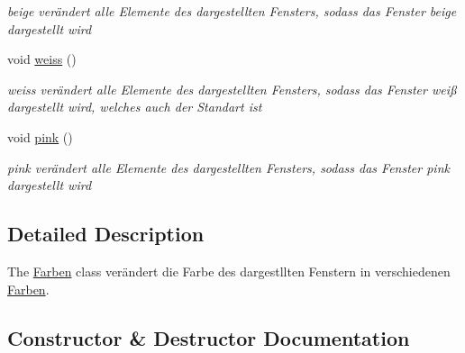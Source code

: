 \begin{DoxyCompactItemize}
\begin{DoxyCompactList}\small\item\em beige verändert alle Elemente des dargestellten Fensters, sodass das Fenster beige dargestellt wird \end{DoxyCompactList}\item 
void \hyperlink{class_farben_aea092a6a334b11f456975325f41c69b4}{weiss} ()\hypertarget{class_farben_aea092a6a334b11f456975325f41c69b4}{}\label{class_farben_aea092a6a334b11f456975325f41c69b4}

\begin{DoxyCompactList}\small\item\em weiss verändert alle Elemente des dargestellten Fensters, sodass das Fenster weiß dargestellt wird, welches auch der Standart ist \end{DoxyCompactList}\item 
void \hyperlink{class_farben_a420c471b006d25535e62c72fbb7068e1}{pink} ()\hypertarget{class_farben_a420c471b006d25535e62c72fbb7068e1}{}\label{class_farben_a420c471b006d25535e62c72fbb7068e1}

\begin{DoxyCompactList}\small\item\em pink verändert alle Elemente des dargestellten Fensters, sodass das Fenster pink dargestellt wird \end{DoxyCompactList}\end{DoxyCompactItemize}


\subsection{Detailed Description}
The \hyperlink{class_farben}{Farben} class verändert die Farbe des dargestllten Fenstern in verschiedenen \hyperlink{class_farben}{Farben}. 

\subsection{Constructor \& Destructor Documentation}
